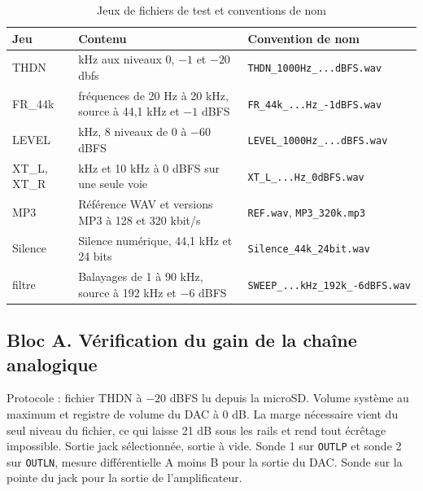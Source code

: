 \begin{table}[H]
  \centering
  \caption{Jeux de fichiers de test et conventions de nom}
  \label{tab:ann_jeux_fichiers}
  \small
  \setlength{\tabcolsep}{5pt}
  \begin{tabular}{@{}
    >{\raggedright\arraybackslash}p{}
    >{\raggedright\arraybackslash}p{}
    >{\raggedright\arraybackslash}p{}@{}}
    \toprule
    \textbf{Jeu} & \textbf{Contenu}                                                & \textbf{Convention de nom}               \\
    \midrule
    THDN         & 1 kHz aux niveaux 0, $-1$ et $-20$ \gls{dbfs}                   & \texttt{THDN\_1000Hz\_...dBFS.wav}       \\
    FR\_44k      & 13 fréquences de 20 Hz à 20 kHz, source à 44,1 kHz et $-1$ dBFS & \texttt{FR\_44k\_...Hz\_-1dBFS.wav}      \\
    LEVEL        & 1 kHz, 8 niveaux de 0 à $-60$ dBFS                              & \texttt{LEVEL\_1000Hz\_...dBFS.wav}      \\
    XT\_L, XT\_R & 1 kHz et 10 kHz à 0 dBFS sur une seule voie                     & \texttt{XT\_L\_...Hz\_0dBFS.wav}         \\
    MP3          & Référence WAV et versions MP3 à 128 et 320 kbit/s               & \texttt{REF.wav}, \texttt{MP3\_320k.mp3} \\
    Silence      & Silence numérique, 44,1 kHz et 24 bits                          & \texttt{Silence\_44k\_24bit.wav}         \\
    filtre       & Balayages de 1 à 90 kHz, source à 192 kHz et $-6$ dBFS          & \texttt{SWEEP\_...kHz\_192k\_-6dBFS.wav} \\
    \bottomrule
  \end{tabular}
\end{table}

\subsection{Bloc A. Vérification du gain de la chaîne analogique}

Protocole : fichier THDN à $-20$ dBFS lu depuis la microSD. Volume système au maximum et registre de volume du \gls{DAC} à 0 dB. La marge nécessaire vient du seul niveau du fichier, ce qui laisse 21 dB sous les rails et rend tout écrêtage impossible. Sortie jack sélectionnée, sortie à vide. Sonde 1 sur \texttt{OUTLP} et sonde 2 sur \texttt{OUTLN}, mesure différentielle A moins B pour la sortie du \gls{DAC}. Sonde sur la pointe du jack pour la sortie de l'amplificateur.

